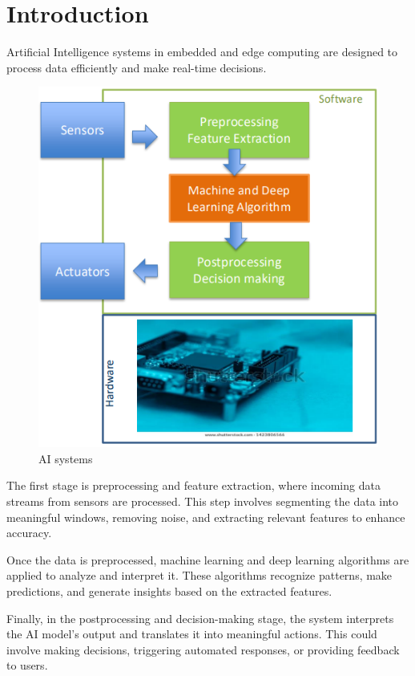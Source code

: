 \section{Introduction}

Artificial Intelligence systems in embedded and edge computing are designed to process data efficiently and make real-time decisions.
\begin{figure}[H]
    \centering
    \includegraphics[width=0.5\linewidth]{images/eeai3.png}
    \caption{AI systems}
\end{figure}
The first stage is preprocessing and feature extraction, where incoming data streams from sensors are processed. 
This step involves segmenting the data into meaningful windows, removing noise, and extracting relevant features to enhance accuracy.

Once the data is preprocessed, machine learning and deep learning algorithms are applied to analyze and interpret it.
These algorithms recognize patterns, make predictions, and generate insights based on the extracted features.

Finally, in the postprocessing and decision-making stage, the system interprets the AI model's output and translates it into meaningful actions. 
This could involve making decisions, triggering automated responses, or providing feedback to users.